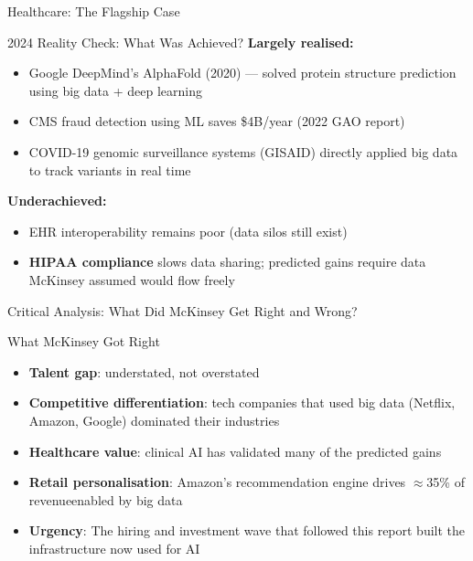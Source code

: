 \documentclass[aspectratio=169,10pt]{beamer}
\begin{document}
\begin{frame}{Healthcare: The Flagship Case}
  
      \begin{exampleblock}{2024 Reality Check: What Was Achieved?}
        \small
        \textbf{Largely realised:}
        \begin{itemize}
          \item Google DeepMind's AlphaFold (2020) --- solved protein structure prediction using big data + deep learning
          \item CMS fraud detection using ML saves \$4B/year (2022 GAO report)
          \item COVID-19 genomic surveillance systems (GISAID) directly applied big data to track variants in real time
        \end{itemize}
        \vspace{4pt}
        \textbf{Underachieved:}
        \begin{itemize}
          \item EHR interoperability remains poor (data silos still exist)
          \item \textbf{HIPAA compliance} slows data sharing; predicted gains require data McKinsey assumed would flow freely
        \end{itemize}
      \end{exampleblock}
  
\end{frame}
\begin{frame}{Critical Analysis: What Did McKinsey Get Right and Wrong?}
 
      \begin{exampleblock}{What McKinsey Got Right \checkmark}
        \begin{itemize}
          \item \textbf{Talent gap}: understated, not overstated
          \item \textbf{Competitive differentiation}: tech companies that used big data (Netflix, Amazon, Google) dominated their industries
          \item \textbf{Healthcare value}: clinical AI has validated many of the predicted gains
          \item \textbf{Retail personalisation}: Amazon's recommendation engine drives $\approx$35\% of revenue\textemdash enabled by big data
          \item \textbf{Urgency}: The hiring and investment wave that followed this report built the infrastructure now used for AI
        \end{itemize}
      \end{exampleblock}
 
\end{frame}
\end{document}
